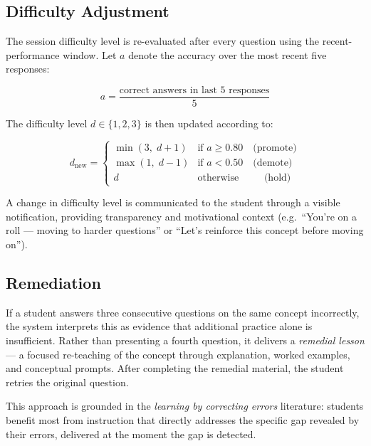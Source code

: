 \documentclass[12pt,a4paper]{article}
\begin{document}
\subsection{Difficulty Adjustment}

The session difficulty level is re-evaluated after every question using the
recent-performance window.  Let $a$ denote the accuracy over the most recent
five responses:

\begin{equation}
  a = \frac{\text{correct answers in last 5 responses}}{5}
\end{equation}

The difficulty level $d \in \{1, 2, 3\}$ is then updated according to:

\begin{equation}
  d_{\text{new}} =
  \begin{cases}
    \min(3,\; d + 1) & \text{if } a \geq 0.80 \quad \text{(promote)} \\
    \max(1,\; d - 1) & \text{if } a < 0.50  \quad \text{(demote)} \\
    d                & \text{otherwise} \quad\quad\;\; \text{(hold)}
  \end{cases}
  \label{eq:difficulty}
\end{equation}

A change in difficulty level is communicated to the student through a
visible notification, providing transparency and motivational context
(e.g.\ ``You're on a roll — moving to harder questions'' or ``Let's
reinforce this concept before moving on'').

\subsection{Remediation}

If a student answers three consecutive questions on the same concept
incorrectly, the system interprets this as evidence that additional practice
alone is insufficient. Rather than presenting a fourth question, it delivers
a \emph{remedial lesson} — a focused re-teaching of the concept through
explanation, worked examples, and conceptual prompts.  After completing the
remedial material, the student retries the original question.

This approach is grounded in the \emph{learning by correcting errors}
literature: students benefit most from instruction that directly addresses
the specific gap revealed by their errors, delivered at the moment the gap
is detected.
\end{document}
